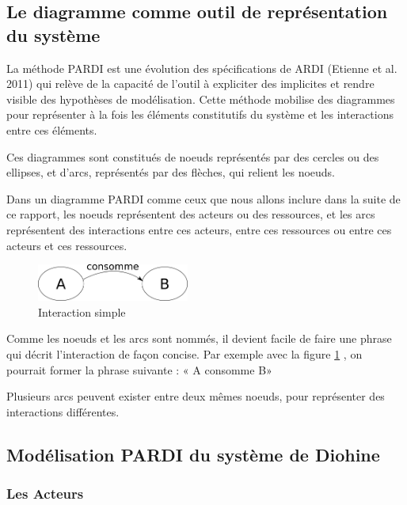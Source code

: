 \subsection{Le diagramme  comme outil de représentation du système}

La méthode PARDI est une évolution des spécifications de ARDI (Etienne et al. 2011) qui relève de la capacité de l'outil à expliciter des implicites et rendre visible des  hypothèses de modélisation. Cette méthode mobilise des diagrammes pour représenter à la fois les éléments constitutifs du système et les interactions entre ces éléments. 

Ces diagrammes sont constitués de noeuds représentés par des cercles ou des ellipses, et d'arcs, représentés par des flèches, qui relient les noeuds. 

Dans un diagramme PARDI comme ceux que nous allons inclure dans la suite de ce rapport, les noeuds représentent des acteurs ou des ressources, et les arcs représentent des interactions entre ces acteurs, entre ces ressources ou entre ces acteurs et ces ressources.

\begin{figure}
\begin{center}
\includegraphics[width=5cm]{img/diagramme_simple.png}
\end{center}
\caption{Interaction simple }
\label{simple_interac}
\end{figure}



Comme les noeuds et les arcs sont nommés, il devient facile de faire une phrase qui décrit l'interaction de façon concise. Par exemple avec la figure \ref{simple_interac} , on pourrait former la phrase suivante : « A consomme B»

Plusieurs arcs peuvent exister entre deux mêmes noeuds, pour représenter des interactions différentes.


\subsection{Modélisation PARDI du système de Diohine}

\subsubsection{Les Acteurs}

